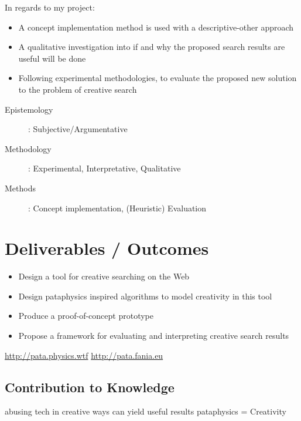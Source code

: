 In regards to my project:
\begin{itemize}
  \item A concept implementation method is used with a descriptive-other approach
  \item A qualitative investigation into if and why the proposed search results are useful will be done
  \item Following experimental methodologies, to evaluate the proposed new solution to the problem of creative search
\end{itemize}

\begin{description}
  \item [Epistemology]: Subjective/Argumentative
  \item [Methodology]: Experimental, Interpretative, Qualitative
  \item [Methods]: Concept implementation, (Heuristic) Evaluation
\end{description}

\section{Deliverables / Outcomes}

\begin{itemize}
  \item Design a tool for creative searching on the Web
  \item Design pataphysics inspired algorithms to model creativity in this tool
  \item Produce a proof-of-concept prototype
  \item Propose a framework for evaluating and interpreting creative search results
\end{itemize}

\url{http://pata.physics.wtf} \marginpar{!!!}
\url{http://pata.fania.eu} \marginpar{!!!}

\subsection{Contribution to Knowledge}

abusing tech in creative ways can yield useful results
pataphysics = Creativity

